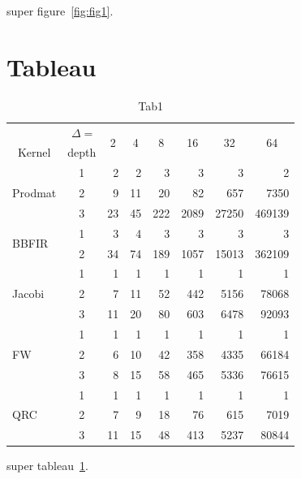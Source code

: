super figure~\ref{fig:fig1}.

\section{Tableau}

\begin{table}
\begin{center}
\begin{scriptsize}

\begin{tabular}{|l|c||r|r|r|r|r|r|}
\hline 
\multicolumn{2}{|r||}{$\Delta = $} & \multicolumn{1}{c|}{\multirow{2}{*}{2}} & \multicolumn{1}{c|}{\multirow{2}{*}{4}} & \multicolumn{1}{c|}{\multirow{2}{*}{8}} & \multicolumn{1}{c|}{\multirow{2}{*}{16}} & \multicolumn{1}{c|}{\multirow{2}{*}{32}} & \multicolumn{1}{c|}{\multirow{2}{*}{64}} \tabularnewline 
\cline{1-2} 
\multicolumn{1}{|c|}{Kernel} & depth & ~   & ~  & ~  & ~  & ~  & ~  \tabularnewline 
\hline 
\hline 
\multirow{3}{*}{Prodmat}  & 1 & 2 & 2 & 3 & 3 & 3 & 2 \tabularnewline 
~ &  2 & 9 & 11 & 20 & 82 & 657 & 7350 \tabularnewline 
~ &  3 & 23 & 45 & 222 & 2089 & 27250 & 469139 \tabularnewline 
\hline 
\multirow{2}{*}{BBFIR} & 1 & 3 & 4 & 3 & 3 & 3 & 3 \tabularnewline 
~ & 2 & 34 & 74 & 189 & 1057 & 15013 & 362109 \tabularnewline 
\hline 
\multirow{3}{*}{Jacobi}  & 1 & 1 & 1 & 1 & 1 & 1 & 1 \tabularnewline 
~ &  2 & 7 & 11 & 52 & 442 & 5156 & 78068 \tabularnewline 
~ &  3 & 11 & 20 & 80 & 603 & 6478 & 92093 \tabularnewline 
\hline 
\multirow{3}{*}{FW}  & 1 & 1 & 1 & 1 & 1 & 1 & 1 \tabularnewline 
~ &  2 & 6 & 10 & 42 & 358  & 4335 & 66184 \tabularnewline 
~ &  3 & 8 & 15 & 58 & 465 & 5336 & 76615 \tabularnewline 
\hline 
\multirow{3}{*}{QRC} &  1 & 1 & 1 & 1 & 1 & 1 & 1 \tabularnewline 
~ &  2 & 7 & 9 & 18 & 76 & 615 & 7019 \tabularnewline 
~ &  3 & 11 & 15 & 48 & 413 & 5237 & 80844 \tabularnewline 
\hline 
\end{tabular}

\end{scriptsize}
\caption{Tab1}
\label{tab:tab1}
\end{center}
\end{table}

super tableau~\ref{tab:tab1}.
